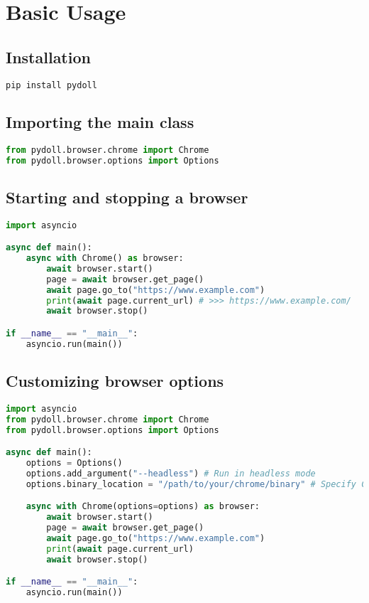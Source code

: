 \documentclass{article}
\begin{document}
\section{Basic Usage}

\subsection{Installation}

\begin{lstlisting}[language=bash]
pip install pydoll
\end{lstlisting}

\subsection{Importing the main class}

\begin{lstlisting}[language=Python]
from pydoll.browser.chrome import Chrome
from pydoll.browser.options import Options
\end{lstlisting}

\subsection{Starting and stopping a browser}

\begin{lstlisting}[language=Python]
import asyncio

async def main():
    async with Chrome() as browser:
        await browser.start()
        page = await browser.get_page()
        await page.go_to("https://www.example.com")
        print(await page.current_url) # >>> https://www.example.com/
        await browser.stop()

if __name__ == "__main__":
    asyncio.run(main())
\end{lstlisting}

\subsection{Customizing browser options}

\begin{lstlisting}[language=Python]
import asyncio
from pydoll.browser.chrome import Chrome
from pydoll.browser.options import Options

async def main():
    options = Options()
    options.add_argument("--headless") # Run in headless mode
    options.binary_location = "/path/to/your/chrome/binary" # Specify Chrome binary path

    async with Chrome(options=options) as browser:
        await browser.start()
        page = await browser.get_page()
        await page.go_to("https://www.example.com")
        print(await page.current_url)
        await browser.stop()

if __name__ == "__main__":
    asyncio.run(main())
\end{lstlisting}
\end{document}

